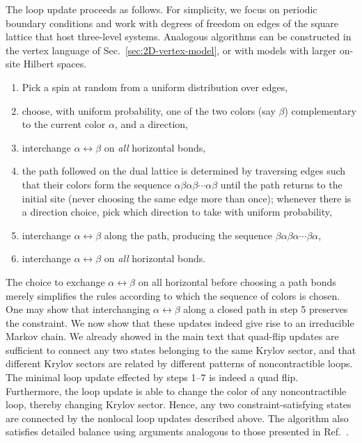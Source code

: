 The loop update proceeds as follows. For simplicity, we focus on periodic boundary conditions and work with degrees of freedom on edges of the square lattice that host three-level systems. Analogous algorithms can be constructed in the vertex language of Sec.~\ref{sec:2D-vertex-model}, or with models with larger on-site Hilbert spaces.
%
%
\begin{enumerate}
    \item Pick a spin at random from a uniform distribution over edges,
    \item choose, with uniform probability, one of the two colors (say $\beta$) complementary to the current color $\alpha$, and a direction,
    \item interchange $\alpha \leftrightarrow \beta$ on \emph{all} horizontal bonds,
    \item the path followed on the dual lattice is determined by traversing edges such that their colors form the sequence $\alpha \beta \alpha \beta \cdots \alpha \beta$ until the path returns to the initial site (never choosing the same edge more than once); whenever there is a direction choice, pick which direction to take with uniform probability,  %
    \item interchange $\alpha \leftrightarrow \beta$ along the path, producing the sequence $\beta \alpha \beta \alpha \cdots \beta \alpha$,
    \item interchange $\alpha \leftrightarrow \beta$ on \emph{all} horizontal bonds.
\end{enumerate}
%
%
The choice to exchange $\alpha \leftrightarrow \beta$ on all horizontal before choosing a path bonds merely simplifies the rules according to which the sequence of colors is chosen.
One may show that interchanging $\alpha \leftrightarrow \beta$ along a closed path in step 5 preserves the constraint. We now show that these updates indeed give rise to an irreducible Markov chain. We already showed in the main text that quad-flip updates are sufficient to connect any two states belonging to the same Krylov sector, and that different Krylov sectors are related by different patterns of noncontractible loops. The minimal loop update effected by steps 1--7 is indeed a quad flip. Furthermore, the loop update is able to change the color of any noncontractible loop, thereby changing Krylov sector. Hence, any two constraint-satisfying states are connected by the nonlocal loop updates described above. The algorithm also satisfies detailed balance using arguments analogous to those presented in Ref.~\cite{BarkemaMonteCarlo}. 

